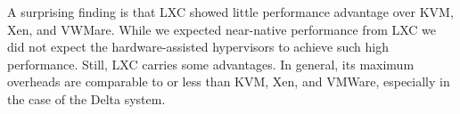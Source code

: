 A surprising finding is that LXC showed little performance advantage over KVM,
Xen, and VWMare.  While we expected near-native performance from LXC we did not expect the
hardware-assisted hypervisors to achieve such high performance.  Still, LXC carries some
advantages.  In general, its maximum overheads are comparable to or less than KVM, Xen, and
VMWare, especially in the case of the Delta system.   







